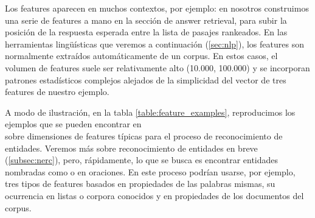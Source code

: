 Los features aparecen en muchos contextos, por ejemplo: en  nosotros construimos una serie de features a mano en la sección de answer retrieval, para subir la posición de la respuesta esperada entre la lista de pasajes rankeados. En las herramientas lingüísticas que veremos a continuación (\ref{sec:nlp}), los features son normalmente extraídos automáticamente de un corpus. En estos casos, el volumen de features suele ser relativamente alto (10.000, 100.000) y se incorporan patrones estadísticos complejos alejados de la simplicidad del vector de tres features de nuestro ejemplo.

A modo de ilustración, en la tabla \ref{table:feature_examples}, reproducimos los ejemplos que se pueden encontrar en \\ \cite{NER1} sobre dimensiones de features típicas para el proceso de reconocimiento de entidades. Veremos más sobre reconocimiento de entidades en breve (\ref{subsec:nerc}), pero, rápidamente, lo que se busca es encontrar entidades nombradas como  o  en oraciones. En este proceso podrían usarse, por ejemplo, tres tipos de features basados en propiedades de las palabras mismas, su ocurrencia en listas o corpora conocidos y en propiedades de los documentos del corpus.

